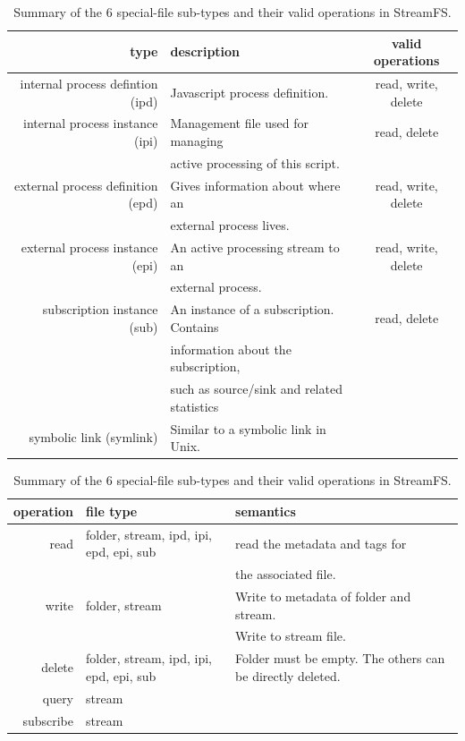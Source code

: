 \begin{table}[h]
\begin{center}
\begin{tabular}{| r | l | c |}
	\hline
	\textbf{type} & \textbf{description} & \textbf{valid operations} \\ \hline
	internal process defintion (ipd) & Javascript process definition.  & read, write, delete  \\

	internal process instance (ipi) & Management file used for managing & read, delete \\
							  & active processing of this script. & \\

	external process definition (epd) & Gives information about where an & read, write, delete \\
								& external process lives. &\\

	external process instance (epi) & An active processing stream to an  & read, write, delete \\
								& external process. &\\

	subscription instance (sub) & An instance of a subscription.  Contains & read, delete \\
								& information about the subscription, &\\
								& such as source/sink and related statistics &\\
	symbolic link (symlink) & Similar to a symbolic link in Unix. & \\
	\hline
\end{tabular}
\caption{Summary of the 6 special-file sub-types and their valid operations in StreamFS.}
\label{tab:filesubtypes}
\end{center}
\end{table}


\begin{table}[h]
\begin{center}
\begin{tabular}{| r | l | l |}
	\hline
	\textbf{operation} & \textbf{file type} & \textbf{semantics} \\ \hline
	read & folder, stream, ipd, ipi, epd, epi, sub & read the metadata and tags for \\
		 &										   & the associated file. \\
	write &  folder, stream & Write to metadata of folder and stream. \\
		& 					& Write to stream file.\\
	delete & folder, stream, ipd, ipi, epd, epi, sub & Folder must be empty.  The others can be directly deleted. \\
	query &  stream & \\
	subscribe & stream & \\
	\hline
\end{tabular}
\caption{Summary of the 6 special-file sub-types and their valid operations in StreamFS.}
\label{tab:semantics}
\end{center}
\end{table}





